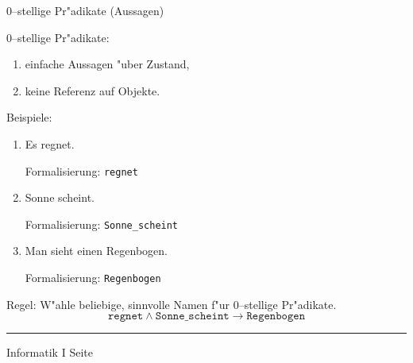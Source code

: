 
\begin{slide}{}
\normalsize
\begin{center}
0--stellige Pr"adikate (Aussagen)
\end{center}
\vspace{0.5cm}

\footnotesize
0--stellige Pr"adikate:
\begin{enumerate}
\item einfache Aussagen "uber Zustand,
\item keine Referenz auf Objekte. 
\end{enumerate}
Beispiele: 
\begin{enumerate}
\item Es regnet.  

        Formalisierung: {\tt regnet}
\item Sonne scheint. 

        Formalisierung: {\tt Sonne\_scheint}
\item Man sieht einen Regenbogen. 

        Formalisierung: {\tt Regenbogen}
\end{enumerate}
Regel: W"ahle beliebige,  sinnvolle Namen f"ur 0--stellige Pr"adikate.
$$ \mathtt{regnet} \wedge \mathtt{Sonne\_scheint} \rightarrow \mathtt{Regenbogen} $$

\vspace*{\fill}
\tiny \addtocounter{mypage}{1}
\rule{15cm}{1mm}
Informatik I  \hspace*{\fill} Seite 
\end{slide}


